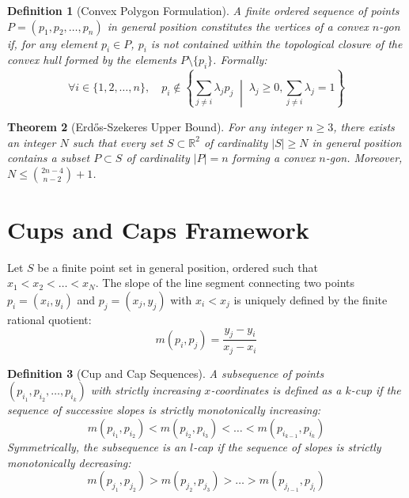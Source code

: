 \documentclass[11pt,a4paper]{article}
\newtheorem{theorem}{Theorem}[section]
\newtheorem{definition}[theorem]{Definition}
\begin{document}
\begin{definition}[Convex Polygon Formulation]
A finite ordered sequence of points $P = (p_1, p_2, \dots, p_n)$ in general position constitutes the vertices of a convex $n$-gon if, for any element $p_i \in P$, $p_i$ is not contained within the topological closure of the convex hull formed by the elements $P \setminus \{p_i\}$. Formally:
\begin{equation}
\forall i \in \{1, 2, \dots, n\}, \quad p_i \notin \left\{ \sum_{j \neq i} \lambda_j p_j \;\middle|\; \lambda_j \ge 0, \sum_{j \neq i} \lambda_j = 1 \right\}
\end{equation}
\end{definition}

\begin{theorem}[Erd\H{o}s-Szekeres Upper Bound]
For any integer $n \ge 3$, there exists an integer $N$ such that every set $S \subset \mathbb{R}^2$ of cardinality $|S| \ge N$ in general position contains a subset $P \subset S$ of cardinality $|P| = n$ forming a convex $n$-gon. Moreover, $N \le \binom{2n-4}{n-2} + 1$.
\end{theorem}

\section{Cups and Caps Framework}

Let $S$ be a finite point set in general position, ordered such that $x_1 < x_2 < \dots < x_N$. The slope of the line segment connecting two points $p_i = (x_i, y_i)$ and $p_j = (x_j, y_j)$ with $x_i < x_j$ is uniquely defined by the finite rational quotient:
\begin{equation}
m(p_i, p_j) = \frac{y_j - y_i}{x_j - x_i}
\end{equation}

\begin{definition}[Cup and Cap Sequences]
A subsequence of points $(p_{i_1}, p_{i_2}, \dots, p_{i_k})$ with strictly increasing $x$-coordinates is defined as a $k$-cup if the sequence of successive slopes is strictly monotonically increasing:
\begin{equation}
m(p_{i_1}, p_{i_2}) < m(p_{i_2}, p_{i_3}) < \dots < m(p_{i_{k-1}}, p_{i_k})
\end{equation}
Symmetrically, the subsequence is an $l$-cap if the sequence of slopes is strictly monotonically decreasing:
\begin{equation}
m(p_{j_1}, p_{j_2}) > m(p_{j_2}, p_{j_3}) > \dots > m(p_{j_{l-1}}, p_{j_l})
\end{equation}
\end{definition}
\end{document}
